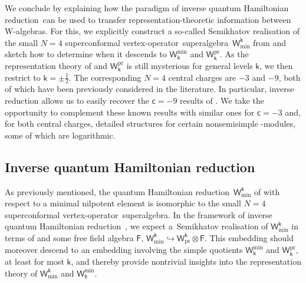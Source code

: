 \documentclass[pdftex]{sigma}
\numberwithin{equation}{section}
\newcommand{\cc}{\mathsf{c}} %
\newcommand{\kk}{\mathsf{k}} %
\newcommand{\alg}[1]{\mathfrak{#1}} %
\newcommand{\VOA}[1]{\mathsf{#1}} %
\newcommand{\SLSA}[3]{\alg{#1}_{#2 \vert #3}} %
\newcommand{\psl}{\SLSA{psl}{2}{2}}
\newcommand{\uaff}[2]{\VOA{V}^{#1}(#2)} %
\newcommand{\upsl}[1][\kk]{\uaff{#1}{\psl}} %
\newcommand{\uwalg}[2]{\VOA{W}^{#1}_{\mathrm{#2}}} %
\newcommand{\swalg}[2]{\VOA{W}_{#1}^{\mathrm{#2}}} %
\newcommand{\upr}[1][\kk]{\uwalg{#1}{pr}} %
\newcommand{\umin}[1][\kk]{\uwalg{#1}{min}} %
\newcommand{\spr}[1][\kk]{\swalg{#1}{pr}} %
\newcommand{\smin}[1][\kk]{\swalg{#1}{min}} %
\newcommand{\sminpmhalf}{\smin[\pm 1/2]}
\newcommand{\vo}{vertex-operator}
\newcommand{\svoa}{\vo\ superalgebra}
\newcommand{\qhr}{quantum Hamiltonian reduction} %
\begin{document}
We conclude by explaining how the paradigm of inverse \qhr\ can be used to transfer representation-theoretic information between W-algebras.
For this, we explicitly construct a so-called Semikhatov realisation of the small $N=4$ superconformal \svoa\ $\umin$ from \smash{$\upr$} and sketch how to determine when it descends to $\smin$ and $\spr$.
As the representation theory of \smash{$\upr$} and $\spr$ is still mysterious for general levels $\kk$, we then restrict to $\kk=\pm\frac{1}{2}$.
The corresponding $N=4$ central charges are $-3$ and $-9$, both of which have been previously considered in the literature.
In particular, inverse reduction allows us to easily recover the $\cc=-9$ results of \cite{AdaRea14,AdaVer20}.
We take the opportunity to complement these known results with similar ones for $\cc=-3$ and, for both central charges, detailed structures for certain nonsemisimple \smash{$\sminpmhalf$}-modules, some of which are logarithmic.

\subsection{Inverse \qhr} \label{sec:iqhr}

As previously mentioned, the \qhr\ $\umin$ of \smash{$\upsl$} with respect to a minimal nilpotent element is isomorphic to the small $N=4$ superconformal \svoa.
In the framework of inverse \qhr\ \cite{AdaRea17,SemInv94}, we expect a~Semikhatov realisation of $\umin$ in terms of \smash{$\upr$} and some free field algebra $\VOA{F}$,
$\umin \hookrightarrow \upr \otimes \VOA{F}$.
This embedding should moreover descend to an embedding involving the simple quotients $\smin$ and $\spr$, at least for most $\kk$, and thereby provide nontrivial insights into the representation theory of $\umin$ and $\smin$.
\end{document}
